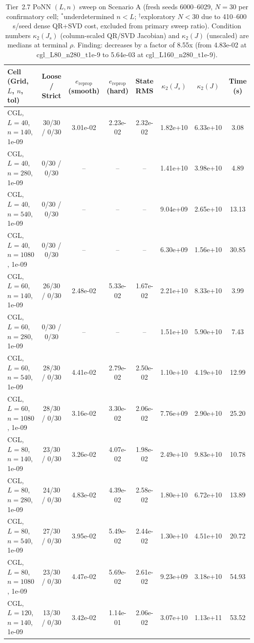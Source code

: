 \begin{table}[t]
\centering
\caption{Tier~2.7 PoNN $(L, n)$ sweep on Scenario A (fresh seeds 6000--6029, $N=30$ per confirmatory cell; $^*$underdetermined $n<L$; $^\dagger$exploratory $N<30$ due to 410--600\,s/seed dense QR+SVD cost, excluded from primary sweep ratio). Condition numbers $\kappa_2(J_s)$ (column-scaled QR/SVD Jacobian) and $\kappa_2(J)$ (unscaled) are medians at terminal $\rho$. Finding: decreases by a factor of 8.55x (from 4.83e-02 at cgl\_L80\_n280\_t1e-9 to 5.64e-03 at cgl\_L160\_n280\_t1e-9).}
\label{tab:tier2_plateau}
\begin{tabular}{lccccccc}
\toprule
Cell (Grid, $L$, $n$, tol) & Loose / Strict & $e_{\mathrm{reprop}}$ (smooth) & $e_{\mathrm{reprop}}$ (hard) & State RMS & $\kappa_2(J_s)$ & $\kappa_2(J)$ & Time (s) \\
\midrule
CGL, $L=40$, $n=140$, 1e-09 & 30/30 / 0/30 & 3.01e-02 & 2.23e-02 & 2.32e-02 & 1.82e+10 & 6.33e+10 & 3.08 \\
CGL, $L=40$, $n=280$, 1e-09 & 0/30 / 0/30 & -- & -- & -- & 1.41e+10 & 3.98e+10 & 4.89 \\
CGL, $L=40$, $n=540$, 1e-09 & 0/30 / 0/30 & -- & -- & -- & 9.04e+09 & 2.65e+10 & 13.13 \\
CGL, $L=40$, $n=1080$, 1e-09 & 0/30 / 0/30 & -- & -- & -- & 6.30e+09 & 1.56e+10 & 30.85 \\
CGL, $L=60$, $n=140$, 1e-09 & 26/30 / 0/30 & 2.48e-02 & 5.33e-02 & 1.67e-02 & 2.21e+10 & 8.33e+10 & 3.99 \\
CGL, $L=60$, $n=280$, 1e-09 & 0/30 / 0/30 & -- & -- & -- & 1.51e+10 & 5.90e+10 & 7.43 \\
CGL, $L=60$, $n=540$, 1e-09 & 28/30 / 0/30 & 4.41e-02 & 2.79e-02 & 2.50e-02 & 1.10e+10 & 4.19e+10 & 12.99 \\
CGL, $L=60$, $n=1080$, 1e-09 & 28/30 / 0/30 & 3.16e-02 & 3.30e-02 & 2.06e-02 & 7.76e+09 & 2.90e+10 & 25.20 \\
CGL, $L=80$, $n=140$, 1e-09 & 23/30 / 0/30 & 3.26e-02 & 4.07e-02 & 1.98e-02 & 2.49e+10 & 9.83e+10 & 10.78 \\
CGL, $L=80$, $n=280$, 1e-09 & 24/30 / 0/30 & 4.83e-02 & 4.39e-02 & 2.58e-02 & 1.80e+10 & 6.72e+10 & 13.89 \\
CGL, $L=80$, $n=540$, 1e-09 & 27/30 / 0/30 & 3.95e-02 & 5.49e-02 & 2.44e-02 & 1.30e+10 & 4.51e+10 & 20.72 \\
CGL, $L=80$, $n=1080$, 1e-09 & 23/30 / 0/30 & 4.47e-02 & 5.69e-02 & 2.61e-02 & 9.23e+09 & 3.18e+10 & 54.93 \\
CGL, $L=120$, $n=140$, 1e-09 & 13/30 / 0/30 & 3.42e-02 & 1.14e-01 & 2.06e-02 & 3.07e+10 & 1.13e+11 & 53.52 \\

\end{tabular}
\end{table}
